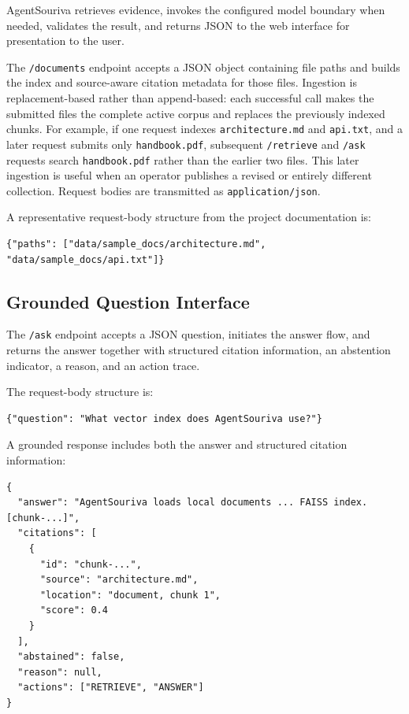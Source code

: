 AgentSouriva retrieves evidence, invokes the configured model boundary when needed, validates the result, and returns JSON to the web interface for presentation to the user.


The \texttt{/documents} endpoint accepts a JSON object containing file paths and builds the index and source-aware citation metadata for those files. Ingestion is replacement-based rather than append-based: each successful call makes the submitted files the complete active corpus and replaces the previously indexed chunks. For example, if one request indexes \texttt{architecture.md} and \texttt{api.txt}, and a later request submits only \texttt{handbook.pdf}, subsequent \texttt{/retrieve} and \texttt{/ask} requests search \texttt{handbook.pdf} rather than the earlier two files. This later ingestion is useful when an operator publishes a revised or entirely different collection. Request bodies are transmitted as \texttt{application/json}.

A representative request-body structure from the project documentation is:

\begin{verbatim}
{"paths": ["data/sample_docs/architecture.md", "data/sample_docs/api.txt"]}
\end{verbatim}

\subsection{Grounded Question Interface}

The \texttt{/ask} endpoint accepts a JSON question, initiates the answer flow, and returns the answer together with structured citation information, an abstention indicator, a reason, and an action trace.

The request-body structure is:

\begin{verbatim}
{"question": "What vector index does AgentSouriva use?"}
\end{verbatim}

A grounded response includes both the answer and structured citation information:

\begin{verbatim}
{
  "answer": "AgentSouriva loads local documents ... FAISS index. [chunk-...]",
  "citations": [
    {
      "id": "chunk-...",
      "source": "architecture.md",
      "location": "document, chunk 1",
      "score": 0.4
    }
  ],
  "abstained": false,
  "reason": null,
  "actions": ["RETRIEVE", "ANSWER"]
}
\end{verbatim}

